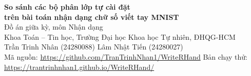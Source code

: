 \documentclass[10pt,a4paper]{article}
\begin{document}
\begin{center}
{\LARGE\bfseries So sánh các bộ phân lớp tự cài đặt\\[2pt] trên bài toán nhận dạng chữ số viết tay MNIST}\\[10pt]
{\large Đồ án giữa kỳ, môn Nhận dạng}\\[3pt]
Khoa Toán -- Tin học, Trường Đại học Khoa học Tự nhiên, ĐHQG-HCM\\[9pt]
Trần Trinh Nhân (24280088) \quad Lâm Nhật Tiến (24280027)\\[3pt]
{\small Mã nguồn: \url{https://github.com/TranTrinhNhan1/WriteRHand}\quad
Bản chạy thử: \url{https://trantrinhnhan1.github.io/WriteRHand/}}
\end{center}
\vspace{4pt}















\appendix

\end{document}
